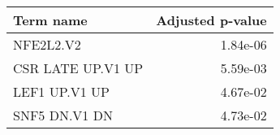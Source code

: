 \begin{tabular}{lr}
\toprule
         Term name &  Adjusted p-value \\
\midrule
         NFE2L2.V2 &          1.84e-06 \\
 CSR LATE UP.V1 UP &          5.59e-03 \\
     LEF1 UP.V1 UP &          4.67e-02 \\
     SNF5 DN.V1 DN &          4.73e-02 \\
\bottomrule
\end{tabular}
